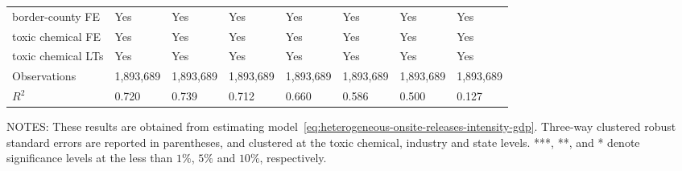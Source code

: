 \begin{table}[H]
{\begin{tabular}{@{}llllllll@{}}
            border-county FE                & Yes       & Yes           & Yes       & Yes          & Yes             & Yes           & Yes                 \\
            toxic chemical FE               & Yes       & Yes           & Yes       & Yes          & Yes             & Yes           & Yes                 \\
            toxic chemical LTs              & Yes       & Yes           & Yes       & Yes          & Yes             & Yes           & Yes                 \\\midrule
            Observations                    & 1,893,689 & 1,893,689     & 1,893,689 & 1,893,689    & 1,893,689       & 1,893,689     & 1,893,689           \\
            $R^2$                           & 0.720     & 0.739         & 0.712     & 0.660        & 0.586           & 0.500         & 0.127               \\ \bottomrule \bottomrule
        \end{tabular}%
    }
    \begin{minipage}{\columnwidth}
        \vspace{0.05in}
        \tiny NOTES: These results are obtained from estimating model~\ref{eq:heterogeneous-onsite-releases-intensity-gdp}. Three-way clustered robust standard errors are reported in parentheses, and clustered at the toxic chemical, industry and state levels. ***, **, and * denote significance levels at the less than $1\%$, $5\%$ and $10\%$, respectively.
    \end{minipage}
\end{table}